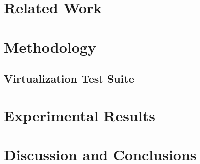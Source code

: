 \documentclass[12pt,onecolumn,oneside]{article}
\begin{document}

\section{Related Work}


\newpage

\section{Methodology}

\subsection{Virtualization Test Suite}

\newpage


\section{Experimental Results}

\newpage

\section{Discussion and Conclusions}

\newpage


\end{document}
